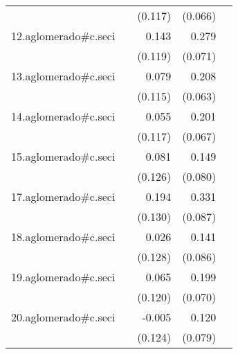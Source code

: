 {\begin{longtable}{l*{4}{D{.}{.}{-1}}}
            &                     &     (0.117)         &     (0.066)         &                     \\
\addlinespace
12.aglomerado#c.seci&                     &       0.143         &       0.279\sym{***}&                     \\
            &                     &     (0.119)         &     (0.071)         &                     \\
\addlinespace
13.aglomerado#c.seci&                     &       0.079         &       0.208\sym{***}&                     \\
            &                     &     (0.115)         &     (0.063)         &                     \\
\addlinespace
14.aglomerado#c.seci&                     &       0.055         &       0.201\sym{**} &                     \\
            &                     &     (0.117)         &     (0.067)         &                     \\
\addlinespace
15.aglomerado#c.seci&                     &       0.081         &       0.149         &                     \\
            &                     &     (0.126)         &     (0.080)         &                     \\
\addlinespace
17.aglomerado#c.seci&                     &       0.194         &       0.331\sym{***}&                     \\
            &                     &     (0.130)         &     (0.087)         &                     \\
\addlinespace
18.aglomerado#c.seci&                     &       0.026         &       0.141         &                     \\
            &                     &     (0.128)         &     (0.086)         &                     \\
\addlinespace
19.aglomerado#c.seci&                     &       0.065         &       0.199\sym{**} &                     \\
            &                     &     (0.120)         &     (0.070)         &                     \\
\addlinespace
20.aglomerado#c.seci&                     &      -0.005         &       0.120         &                     \\
            &                     &     (0.124)         &     (0.079)         &                     \\

\end{longtable}}

